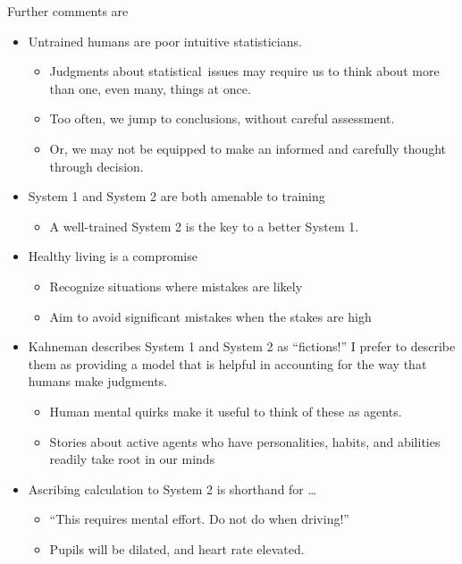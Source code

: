 \documentclass[
  10pt,
  b5paper]{book}
\providecommand{\tightlist}{%
  \setlength{\itemsep}{0pt}\setlength{\parskip}{0pt}}
\begin{document}
Further comments are

\begin{itemize}
\tightlist
\item
  Untrained humans are poor intuitive statisticians.

  \begin{itemize}
  \tightlist
  \item
    Judgments about statistical~issues may require us to think
    about more than one, even many, things at once.
  \item
    Too often, we jump to conclusions, without careful assessment.
  \item
    Or, we may not be equipped to make an informed and carefully
    thought through decision.
  \end{itemize}
\item
  System 1 and System 2 are both amenable to training

  \begin{itemize}
  \tightlist
  \item
    A well-trained System 2 is the key to a better System 1.\\
  \end{itemize}
\item
  Healthy living is a compromise

  \begin{itemize}
  \tightlist
  \item
    Recognize situations where mistakes are likely
  \item
    Aim to avoid significant mistakes when the stakes are high
  \end{itemize}
\item
  Kahneman describes System 1 and System 2 as ``fictions!'' I prefer
  to describe them as providing a model that is helpful in
  accounting for the way that humans make judgments.

  \begin{itemize}
  \tightlist
  \item
    Human mental quirks make it useful to think of these as agents.
  \item
    Stories about active agents who have personalities, habits, and
    abilities readily take root in our minds
  \end{itemize}
\item
  Ascribing calculation to System 2 is shorthand for \ldots{}

  \begin{itemize}
  \tightlist
  \item
    ``This requires mental effort. Do not do when driving!''
  \item
    Pupils will be dilated, and heart rate elevated.
  \end{itemize}
\end{itemize}
\end{document}
